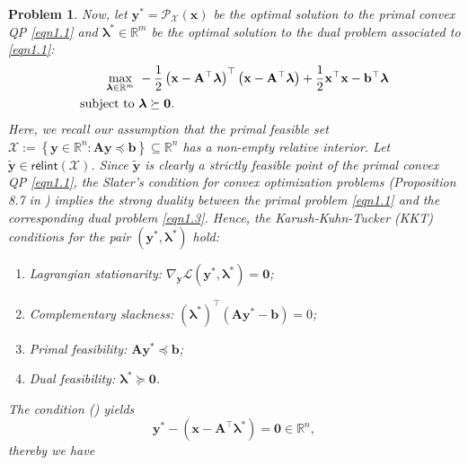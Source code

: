 \documentclass[11pt]{article}
\newtheorem{problem}{Problem}
\begin{document}
\begin{problem}
{\indent Now, let $\mathbf{y}^* = \mathcal{P}_{\mathcal{X}}(\mathbf{x})$ be the optimal solution to the primal convex QP \eqref{eqn1.1} and $\bm{\lambda}^* \in \mathbb{R}^m$ be the optimal solution to the dual problem associated to \eqref{eqn1.1}:
\begin{equation}
    \label{eqn1.3}
    \begin{split}
        \max_{\bm{\lambda} \in \mathbb{R}^m} \ & - \frac{1}{2} \left( \mathbf{x} - \mathbf{A}^{\top} \bm{\lambda} \right)^{\top} \left( \mathbf{x} - \mathbf{A}^{\top} \bm{\lambda} \right) + \frac{1}{2} \mathbf{x}^{\top} \mathbf{x} - \mathbf{b}^{\top} \bm{\lambda} \\
        \textnormal{subject to } & \bm{\lambda} \succeq \mathbf{0}.
    \end{split}
\end{equation}
Here, we recall our assumption that the primal feasible set $\mathcal{X} := \left\{ \mathbf{y} \in \mathbb{R}^n : \mathbf{Ay} \preceq \mathbf{b} \right\} \subseteq \mathbb{R}^n$ has a non-empty relative interior. Let $\tilde{\mathbf{y}} \in \textsf{relint}(\mathcal{X})$. Since $\tilde{\mathbf{y}}$ is clearly a strictly feasible point of the primal convex QP \eqref{eqn1.1}, the Slater's condition for convex optimization problems (\emph{Proposition 8.7} in \cite{calafiore2014optimization}) implies the strong duality between the primal problem \eqref{eqn1.1} and the corresponding dual problem \eqref{eqn1.3}. Hence, the Karush-Kuhn-Tucker (KKT) conditions for the pair $\left( \mathbf{y}^*, \bm{\lambda}^* \right)$ hold:
\begin{enumerate} [label=(\roman*)]
    \item Lagrangian stationarity: $\nabla_{\mathbf{y}} \mathcal{L} \left( \mathbf{y}^*, \bm{\lambda}^* \right) = \mathbf{0}$;
    \item Complementary slackness: $\left( \bm{\lambda}^* \right)^{\top} \left( \mathbf{A} \mathbf{y}^* - \mathbf{b} \right) = 0$;
    \item Primal feasibility: $\mathbf{A} \mathbf{y}^* \preceq \mathbf{b}$;
    \item Dual feasibility: $\bm{\lambda}^* \succeq \mathbf{0}$.
\end{enumerate}
The condition () yields
\begin{equation*}
    \mathbf{y}^* - \left( \mathbf{x} - \mathbf{A}^{\top} \bm{\lambda}^* \right) = \mathbf{0} \in \mathbb{R}^n,
\end{equation*}
thereby we have
\begin{equation}

\end{equation}}
\end{problem}
\end{document}
